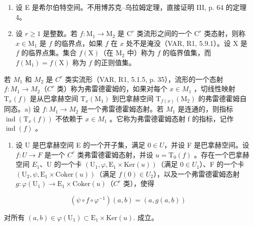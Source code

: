 \begin{enumerate}
\def\labelenumi{\arabic{enumi})}
\setcounter{enumi}{7}
\item
  设 E 是希尔伯特空间。不用博苏克–乌拉姆定理，直接证明 III, p. 64 的定理 4。
\item
  设 \(r \geqslant 1\) 是整数。若 \(f: \mathrm{M}_1 \to \mathrm{M}_2\) 是 \(\mathrm{C}^r\) 类流形之间的一个 \(\mathrm{C}^r\) 类态射，则称 \(x \in \mathrm{M}_1\) 是 \(f\) 的临界点，如果 \(f\) 在 \(x\) 处不是淹没（VAR, R1, 5.9.1）。设 X 是 \(f\) 的临界点集。集合 \(f(\mathrm{X})\)（在 \(\mathrm{M}_2\) 中）称为 \(f\) 的临界值集，而 \(f(\mathrm{M}_1) = f(\mathrm{X})\) 称为 \(f\) 的正则值集。
\end{enumerate}

若 \(M_{1}\) 和 \(M_{2}\) 是 \(C^{r}\) 类实流形（VAR, R1, 5.1.5, p. 35），流形的一个态射 \(f: M_{1} \to M_{2}\)（\(C^{r}\) 类）称为弗雷德霍姆的，如果对每个 \(x \in M_{1}\) ，切线性映射 \(\mathrm{T}_{x}(f)\) 是从巴拿赫空间 \(\mathrm{T}_{x}(\mathrm{M}_{1})\) 到巴拿赫空间 \(\mathrm{T}_{f(x)}(\mathrm{M}_{2})\) 的弗雷德霍姆自同态。a) 设 \(f: M_{1} \to M_{2}\) 是一个弗雷德霍姆态射。若 \(M_{1}\) 是连通的，则指标 \(\operatorname{ind}(\mathrm{T}_{x}(f))\) 不依赖于 \(x \in M_{1}\) 。它称为弗雷德霍姆态射 f 的指标，记作 \(\operatorname{ind}(f)\) 。

\begin{enumerate}
\def\labelenumi{\alph{enumi})}
\setcounter{enumi}{1}
\tightlist
\item
  设 U 是巴拿赫空间 E 的一个开子集，满足 \(0 \in U\)，并设 F 是巴拿赫空间。设 \(f: U \to F\) 是一个 \(C^{r}\) 类弗雷德霍姆态射，并设 \(u = \mathrm{T}_{0}(f)\) 。存在一个巴拿赫空间 \(E_{1}\)、U 的一个卡 \((\mathrm{U}_{1}, \varphi, \mathrm{E}_{1} \times \mathrm{Ker}(u))\)（满足 \(0 \in U_{1}\)）、F 的一个卡 \((\mathrm{U}_{2}, \psi, \mathrm{E}_{1} \times \mathrm{Coker}(u))\)（满足 \(f(0) \in U_{2}\)），以及一个弗雷德霍姆态射 \(g: \varphi(\mathrm{U}_{1}) \to \mathrm{E}_{1} \times \mathrm{Coker}(u)\)（\(C^{r}\) 类），使得
\end{enumerate}

\[
(\psi \circ f \circ \varphi^ {- 1}) (a, b) = (a, g (a, b))
\]

对所有 \((a,b)\in \varphi (\mathrm{U}_1)\subset \mathrm{E}_1\times \mathrm{Ker}(u).\) 成立。

